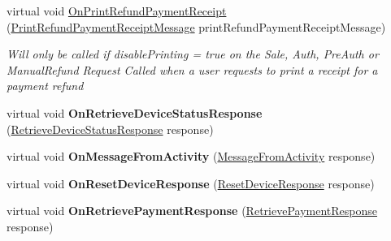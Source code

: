 \begin{DoxyCompactItemize}
virtual void \hyperlink{classcom_1_1clover_1_1remotepay_1_1sdk_1_1_default_clover_connector_listener_a13de716522e58beb9af010207e7362f2}{On\+Print\+Refund\+Payment\+Receipt} (\hyperlink{classcom_1_1clover_1_1remotepay_1_1sdk_1_1_print_refund_payment_receipt_message}{Print\+Refund\+Payment\+Receipt\+Message} print\+Refund\+Payment\+Receipt\+Message)
\begin{DoxyCompactList}\small\item\em Will only be called if disable\+Printing = true on the Sale, Auth, Pre\+Auth or Manual\+Refund Request Called when a user requests to print a receipt for a payment refund \end{DoxyCompactList}\item 
\mbox{\label{classcom_1_1clover_1_1remotepay_1_1sdk_1_1_default_clover_connector_listener_a493d5c1fde5a535262b497450c4d2a8f}} 
virtual void {\bfseries On\+Retrieve\+Device\+Status\+Response} (\hyperlink{classcom_1_1clover_1_1remotepay_1_1sdk_1_1_retrieve_device_status_response}{Retrieve\+Device\+Status\+Response} response)
\item 
\mbox{\label{classcom_1_1clover_1_1remotepay_1_1sdk_1_1_default_clover_connector_listener_a1ae1e3ea093662ba2a137afb50453aa9}} 
virtual void {\bfseries On\+Message\+From\+Activity} (\hyperlink{classcom_1_1clover_1_1remotepay_1_1sdk_1_1_message_from_activity}{Message\+From\+Activity} response)
\item 
\mbox{\label{classcom_1_1clover_1_1remotepay_1_1sdk_1_1_default_clover_connector_listener_aac55ac00dcd9150f9b05f2b74597c868}} 
virtual void {\bfseries On\+Reset\+Device\+Response} (\hyperlink{classcom_1_1clover_1_1remotepay_1_1sdk_1_1_reset_device_response}{Reset\+Device\+Response} response)
\item 
\mbox{\label{classcom_1_1clover_1_1remotepay_1_1sdk_1_1_default_clover_connector_listener_a275810025eccbd5cc81fe48752fa8872}} 
virtual void {\bfseries On\+Retrieve\+Payment\+Response} (\hyperlink{classcom_1_1clover_1_1remotepay_1_1sdk_1_1_retrieve_payment_response}{Retrieve\+Payment\+Response} response)
\end{DoxyCompactItemize}


